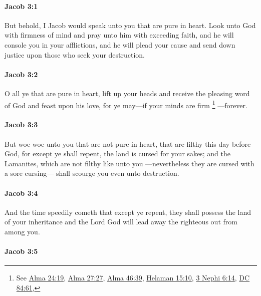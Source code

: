 		\paragraph{Jacob 3:1} %
			\label{JACOB-3-1}

			But behold, I Jacob would speak unto you that are pure in heart.
			Look unto God with firmness of mind
			and pray unto him with exceeding faith,
			and he will console you in your afflictions,
			and he will plead your cause
			and send down justice upon those who seek your destruction.

		\paragraph{Jacob 3:2} %
			\label{JACOB-3-2}

			O all ye that are pure in heart,
			lift up your heads and receive the pleasing word of God
			and feast upon his love,
			for ye may---if your minds are firm%
				\footnote{%
					See \hyperref[ALMA-24-19]{Alma 24:19}, \hyperref[ALMA-27-27]{Alma 27:27}, \hyperref[ALMA-446-39]{Alma 46:39}, \hyperref[HELAMAN-15-10]{Helaman 15:10}, \hyperref[3NEPHI-6-14]{3 Nephi 6:14}, \hyperref[DC84-61]{DC 84:61}, 
					}%
			---forever.

		\paragraph{Jacob 3:3} %
			\label{JACOB-3-3}

			But woe woe unto you that are not pure in heart,
			that are filthy this day before God,
			for except ye shall repent, the land is cursed for your sakes;
			and the Lamanites, which are not filthy like unto you
			---nevertheless they are cursed with a sore cursing---
			shall scourge you even unto destruction.

		\paragraph{Jacob 3:4} %
			\label{JACOB-3-4}

			And the time speedily cometh that except ye repent,
			they shall possess the land of your inheritance
			and the Lord God will lead away the righteous out from among you.

		\paragraph{Jacob 3:5} %
			\label{JACOB-3-5}

